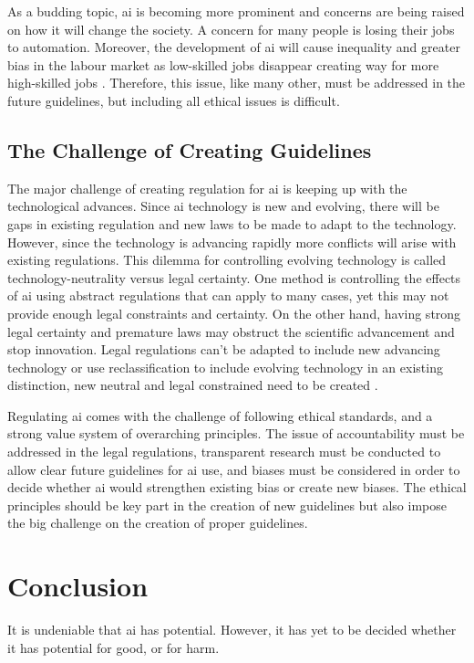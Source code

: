 \documentclass{report}
\begin{document}
As a budding topic, \ac{ai} is becoming more prominent and concerns are being raised on how it will change the society.
A concern for many people is losing their jobs to automation. 
Moreover, the development of \ac{ai} will cause inequality and greater bias in the labour market as low-skilled jobs disappear creating way for more high-skilled jobs \citep{leenes2017}.
Therefore, this issue, like many other, must be addressed in the future guidelines, but including all ethical issues is difficult.

\subsection{The Challenge of Creating Guidelines}
The major challenge of creating regulation for \ac{ai} is keeping up with the technological advances. 
Since \ac{ai} technology is new and evolving, there will be gaps in existing regulation and new laws to be made to adapt to the technology. 
However, since the technology is advancing rapidly more conflicts will arise with existing regulations. 
This dilemma for controlling evolving technology is called technology-neutrality versus legal certainty. 
One method is controlling the effects of \ac{ai} using abstract regulations that can apply to many cases, yet this may not provide enough legal constraints and certainty. 
On the other hand, having strong legal certainty and premature laws may obstruct the scientific advancement and stop innovation. 
Legal regulations can’t be adapted to include new advancing technology or use reclassification to include evolving technology in an existing distinction, new neutral and legal constrained need to be created \citep{leenes2017}. 

Regulating \ac{ai} comes with the challenge of following ethical standards, and a strong value system of overarching principles. 
The issue of accountability must be addressed in the legal regulations, transparent research must be conducted to allow clear future guidelines for \ac{ai} use, and biases must be considered in order to decide whether \ac{ai} would strengthen existing bias or create new biases. 
The ethical principles should be key part in the creation of new guidelines but also impose the big challenge on the creation of proper guidelines. 

\section{Conclusion}
It is undeniable that \ac{ai} has potential. 
However, it has yet to be decided whether it has potential for good, or for harm. 
\end{document}
